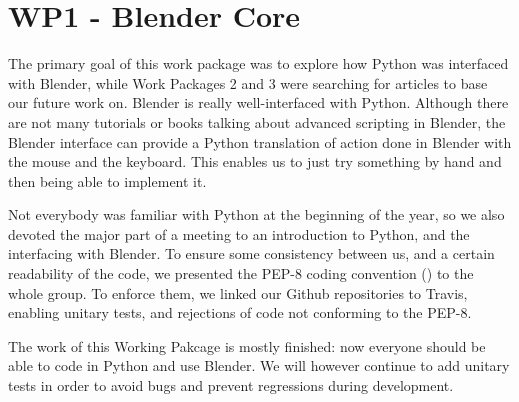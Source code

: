 \section{WP1 - Blender Core}

The primary goal of this work package was to explore how Python was interfaced with Blender, while Work Packages 2 and 3 were searching for articles to base our future work on. Blender is really well-interfaced with Python. Although there are not many tutorials or books talking about advanced scripting in Blender, the Blender interface can provide a Python translation of action done in Blender with the mouse and the keyboard. This enables us to just try something by hand and then being able to implement it. 
\par Not everybody was familiar with Python at the beginning of the year, so we also devoted the major part of a meeting to an introduction to Python, and the interfacing with Blender. To ensure some consistency between us, and a certain readability of the code, we presented the PEP-8 coding convention (\cite{pep8}) to the whole group. To enforce them, we linked our Github repositories to Travis, enabling unitary tests, and rejections of code not conforming to the PEP-8.
\par The work of this Working Pakcage is mostly finished: now everyone should be able to code in Python and use Blender. We will however continue to add unitary tests in order to avoid bugs and prevent regressions during development. 

